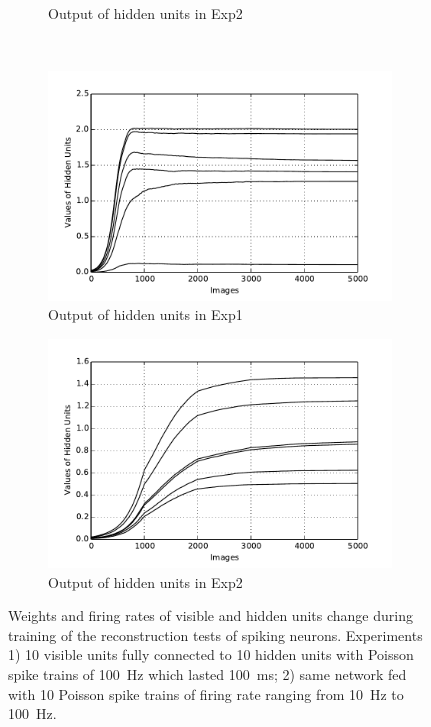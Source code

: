 \begin{figure}
\begin{subfigure}[t]{0.4\textwidth}
			\caption{Output of hidden units in Exp2}
		\end{subfigure}\\
		\begin{subfigure}[t]{0.4\textwidth}
			\includegraphics[width=\textwidth]{pics_ae/exp1_hid_nons_decay.pdf}
			\caption{Output of hidden units in Exp1}
		\end{subfigure}
		\begin{subfigure}[t]{0.4\textwidth}
			\includegraphics[width=\textwidth]{pics_ae/exp2_hid_nons_decay.pdf}
			\caption{Output of hidden units in Exp2}
		\end{subfigure}
		\caption{Weights and firing rates of visible and hidden units change during training of the reconstruction tests of spiking neurons. 
			Experiments 1) 10 visible units fully connected to 10 hidden units with Poisson spike trains of 100~Hz which lasted 100~ms; 2) same network fed with 10 Poisson spike trains of firing rate ranging from 10~Hz to 100~Hz.}
	\end{figure}

